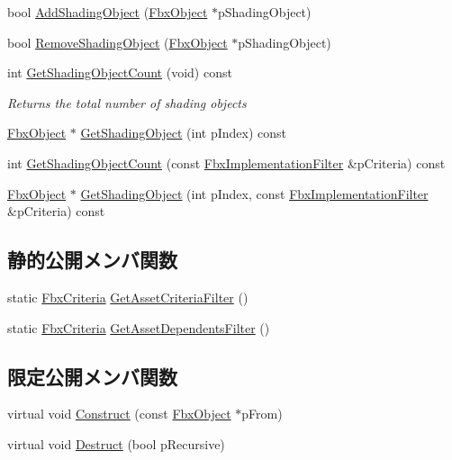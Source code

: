 \begin{DoxyCompactItemize}
bool \hyperlink{class_fbx_library_a041b82a3689dbf2912d81d0f69218ab7}{Add\+Shading\+Object} (\hyperlink{class_fbx_object}{Fbx\+Object} $\ast$p\+Shading\+Object)
\item 
bool \hyperlink{class_fbx_library_aafacfb4acfe28124217e4b0ffb0dcadc}{Remove\+Shading\+Object} (\hyperlink{class_fbx_object}{Fbx\+Object} $\ast$p\+Shading\+Object)
\item 
int \hyperlink{class_fbx_library_a0b5b034aeeb0d6a0f671fa4020ea1e07}{Get\+Shading\+Object\+Count} (void) const
\begin{DoxyCompactList}\small\item\em Returns the total number of shading objects \end{DoxyCompactList}\item 
\hyperlink{class_fbx_object}{Fbx\+Object} $\ast$ \hyperlink{class_fbx_library_ae7783de818ed0eca3fa34ff6378685fb}{Get\+Shading\+Object} (int p\+Index) const
\item 
int \hyperlink{class_fbx_library_a5b43bbc0e02d7d48628c2dc18980fdd8}{Get\+Shading\+Object\+Count} (const \hyperlink{class_fbx_implementation_filter}{Fbx\+Implementation\+Filter} \&p\+Criteria) const
\item 
\hyperlink{class_fbx_object}{Fbx\+Object} $\ast$ \hyperlink{class_fbx_library_a1eb2147612d1073d6afbf562adfe3c25}{Get\+Shading\+Object} (int p\+Index, const \hyperlink{class_fbx_implementation_filter}{Fbx\+Implementation\+Filter} \&p\+Criteria) const
\end{DoxyCompactItemize}
\subsection*{静的公開メンバ関数}
\begin{DoxyCompactItemize}
\item 
static \hyperlink{class_fbx_criteria}{Fbx\+Criteria} \hyperlink{class_fbx_library_a562702d3ba172e178bf0d63ba5b9974b}{Get\+Asset\+Criteria\+Filter} ()
\item 
static \hyperlink{class_fbx_criteria}{Fbx\+Criteria} \hyperlink{class_fbx_library_a88507d4654d1a906ea7999165af7d92b}{Get\+Asset\+Dependents\+Filter} ()
\end{DoxyCompactItemize}
\subsection*{限定公開メンバ関数}
\begin{DoxyCompactItemize}
\item 
virtual void \hyperlink{class_fbx_library_a8e9fbf97f6753d859411f284db16f964}{Construct} (const \hyperlink{class_fbx_object}{Fbx\+Object} $\ast$p\+From)
\item 
virtual void \hyperlink{class_fbx_library_ad763dd7c511f4c97d1163545de1bbbe9}{Destruct} (bool p\+Recursive)
\end{DoxyCompactItemize}
